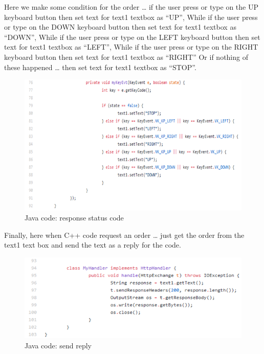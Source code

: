 \newpage
Here we make some condition for the order … if the user press or type on the UP keyboard button then set text for text1 textbox as “UP”, While if the user press or type on the DOWN keyboard button then set text for text1 textbox as “DOWN”, While if the user press or type on the LEFT keyboard button then set text for text1 textbox as “LEFT”, While if the user press or type on the RIGHT keyboard button then set text for text1 textbox as “RIGHT” Or if nothing of these happened … then set text for text1 textbox as “STOP”.

\begin{figure}[h]
    \centering
    \includegraphics[width=.9\textwidth]{figures/48.png}
    \caption{Java code: response status code}
    \label{fig:my_label}
\end{figure}

\newpage

Finally, here when C++ code request an order … just get the order from the text1 text box and send the text as a reply for the code.

\begin{figure}[h]
    \centering
    \includegraphics{figures/49.png}
    \caption{Java code: send reply}
    \label{fig:my_label}
\end{figure}

\newpage

